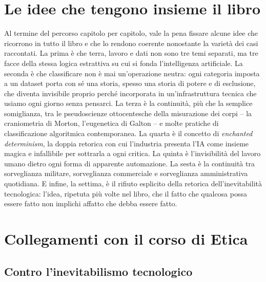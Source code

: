 \documentclass[a4paper,11pt]{article}
\begin{document}
\section{Le idee che tengono insieme il libro}

Al termine del percorso capitolo per capitolo, vale la pena fissare alcune idee che ricorrono in tutto il libro e che lo rendono coerente nonostante la varietà dei casi raccontati. La prima è che terra, lavoro e dati non sono tre temi separati, ma tre facce della stessa logica estrattiva su cui si fonda l'intelligenza artificiale. La seconda è che classificare non è mai un'operazione neutra: ogni categoria imposta a un dataset porta con sé una storia, spesso una storia di potere e di esclusione, che diventa invisibile proprio perché incorporata in un'infrastruttura tecnica che usiamo ogni giorno senza pensarci. La terza è la continuità, più che la semplice somiglianza, tra le pseudoscienze ottocentesche della misurazione dei corpi -- la craniometria di Morton, l'eugenetica di Galton -- e molte pratiche di classificazione algoritmica contemporanea. La quarta è il concetto di \emph{enchanted determinism}, la doppia retorica con cui l'industria presenta l'IA come insieme magica e infallibile per sottrarla a ogni critica. La quinta è l'invisibilità del lavoro umano dietro ogni forma di apparente automazione. La sesta è la continuità tra sorveglianza militare, sorveglianza commerciale e sorveglianza amministrativa quotidiana. E infine, la settima, è il rifiuto esplicito della retorica dell'inevitabilità tecnologica: l'idea, ripetuta più volte nel libro, che il fatto che qualcosa possa essere fatto non implichi affatto che debba essere fatto.

\section{Collegamenti con il corso di Etica}

\subsection{Contro l'inevitabilismo tecnologico}
\end{document}
